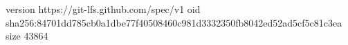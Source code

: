 version https://git-lfs.github.com/spec/v1
oid sha256:84701dd785cb0a1dbe77f40508460c981d3332350fb8042ed52ad5cf5c81c3ea
size 43864
